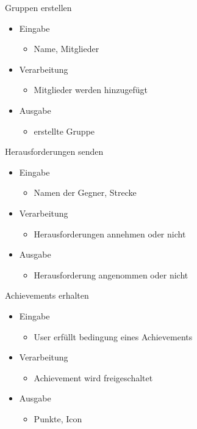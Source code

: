 \documentclass[a4paper, 12pp]{article}
\begin{document}
\bigskip
{\Large Gruppen erstellen}\\
\begin{itemize}
\item Eingabe
	\begin{itemize}
	\item Name, Mitglieder
	\end{itemize}
\item Verarbeitung
	\begin{itemize}
	\item Mitglieder werden hinzugefügt
	\end{itemize}
\item Ausgabe
	\begin{itemize}
	\item erstellte Gruppe
	\end{itemize}
\end{itemize}

\bigskip
{\Large Herausforderungen senden}\\
\begin{itemize}
\item Eingabe
	\begin{itemize}
	\item Namen der Gegner, Strecke
	\end{itemize}
\item Verarbeitung
	\begin{itemize}
	\item Herausforderungen annehmen oder nicht
	\end{itemize}
\item Ausgabe
	\begin{itemize}
	\item Herausforderung angenommen oder nicht
	\end{itemize}
\end{itemize}

\bigskip
{\Large Achievements erhalten}\\
\begin{itemize}
\item Eingabe
	\begin{itemize}
	\item User erfüllt bedingung eines Achievements
	\end{itemize}
\item Verarbeitung
	\begin{itemize}
	\item Achievement wird freigeschaltet
	\end{itemize}
\item Ausgabe
	\begin{itemize}
	\item Punkte, Icon
	\end{itemize}
\end{itemize}
\end{document}
